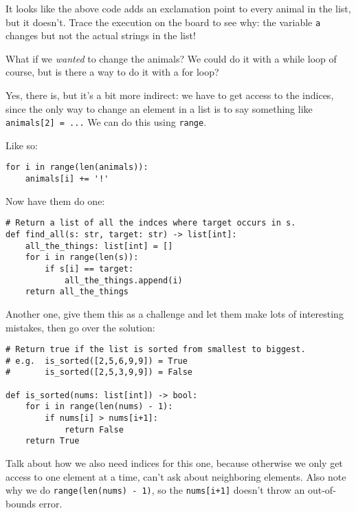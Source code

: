 \documentclass{article}
\begin{document}
It looks like the above code adds an exclamation point to every animal
in the list, but it doesn't.  Trace the execution on the board to see
why: the variable \verb|a| changes but not the actual strings in the list!

What if we \emph{wanted} to change the animals?  We could do it with a
while loop of course, but is there a way to do it with a for loop?

Yes, there is, but it's a bit more indirect: we have to get access to
the indices, since the only way to change an element in a list is to
say something like \verb|animals[2] = ...| We can do this using
\verb|range|.

Like so:
\begin{verbatim}
for i in range(len(animals)):
    animals[i] += '!'
\end{verbatim}

Now have them do one:
\begin{verbatim}
# Return a list of all the indces where target occurs in s.
def find_all(s: str, target: str) -> list[int]:
    all_the_things: list[int] = []
    for i in range(len(s)):
        if s[i] == target:
            all_the_things.append(i)
    return all_the_things
\end{verbatim}

Another one, give them this as a challenge and let them make lots of
interesting mistakes, then go over the solution:
\begin{verbatim}
# Return true if the list is sorted from smallest to biggest.
# e.g.  is_sorted([2,5,6,9,9]) = True
#       is_sorted([2,5,3,9,9]) = False

def is_sorted(nums: list[int]) -> bool:
    for i in range(len(nums) - 1):
        if nums[i] > nums[i+1]:
            return False
    return True
\end{verbatim}

Talk about how we also need indices for this one, because otherwise we
only get access to one element at a time, can't ask about neighboring
elements.  Also note why we do \verb|range(len(nums) - 1)|, so the
\verb|nums[i+1]| doesn't throw an out-of-bounds error.



\end{document}
